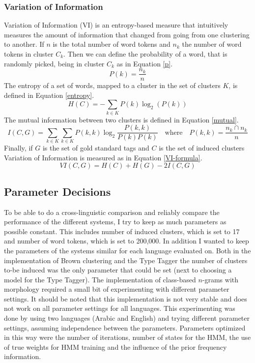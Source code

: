 \documentclass[11pt]{article}
\begin{document}
{\subsubsection{Variation of Information}
Variation of Information (VI) is an entropy-based measure that intuitively measures the amount of information that changed from going from one clustering to another. If $n$ is the total number of word tokens and $n_k$ the number of word tokens in cluster $C_k$. Then we can define the probability of a word, that is randomly picked, being in cluster $C_k$ as in Equation \ref{p}.
\begin{equation}\label{p}
P(k) = \frac{n_k}{n}
\end{equation}
The entropy of a set of words, mapped to a cluster in the set of clusters $K$, is defined in Equation \ref{entropy}.
\begin{equation}\label{entropy}
H(C) = - \sum_{k\in K} P(k) \log_{2} (P(k))
\end{equation}
The mutual information between two clusters is defined in Equation \ref{mutual}.
\begin{equation}\label{mutual}
 I(C,G) = \sum_{k\in K}\sum_{k\in K} P(k, k)\log_{2}\frac{P(k, k)}{P(k)P(k)}\quad\textrm{where}\quad P(k,k) = \frac{n_k \cap n_k}{n}
\end{equation}
Finally, if $G$ is the set of gold standard tags and $C$ is the set of induced clusters Variation of Information is measured as in Equation \ref{VI-formula}.
\begin{equation}\label{VI-formula}
VI(C,G) = H(C) +H(G) - 2I(C,G)
\end{equation}

\subsection{Parameter Decisions}
To be able to do a cross-linguistic comparison and reliably compare the performance of the different systems, I try to keep as much parameters as possible constant. This includes number of induced clusters, which is set to 17 and number of word tokens, which is set to 200,000. In addition I wanted to keep the parameters of the systems similar for each language evaluated on. Both in the implementation of Brown clustering and the Type Tagger the number of clusters to-be induced was the only parameter that could be set (next to choosing a model for the Type Tagger). The implementation of class-based $n$-grams with morphology required a small bit of experimenting with different parameter settings. It should be noted that this implementation is not very stable and does not work on all parameter settings for all languages. This experimenting was done by using two languages (Arabic and English) and trying different parameter settings, assuming independence between the parameters. Parameters optimized in this way were the number of iterations, number of states for the HMM, the use of true weights for HMM training and the influence of the prior frequency information. 

}
\end{document}

